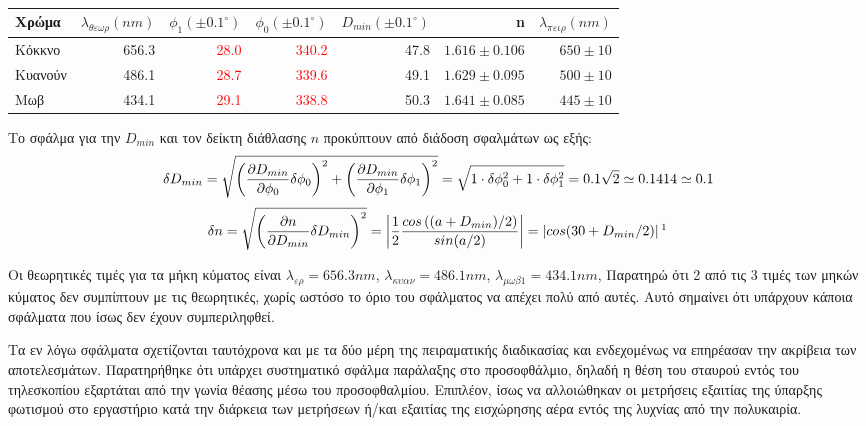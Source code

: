 \documentclass[a4paper]{article}
\begin{document}
\begin{table}[h!]
\centering 
\caption{ }
\begin{tabular}{l|r|r|r|r|r|r} 
  Χρώμα & $\lambda_{θεωρ}(nm)$&$\phi_1 (\pm0.1^{\circ})$ & $\phi_0 (\pm0.1^{\circ})$ &   $D_{min}(\pm0.1^{\circ})$
   & n & $\lambda_{πειρ}(nm)$ \\  
\hline \hline  
 Κόκκνο &   656.3 & \textcolor{red}{28.0} & \textcolor{red}{340.2} &   47.8   & $1.616\pm 0.106$   & $650\pm10$ \\     %
  Κυανούν &   486.1 & \textcolor{red}{28.7} & \textcolor{red}{339.6} &   49.1 & $1.629\pm 0.095$   & \underline{$500\pm10$} \\     %
  Μωβ &   434.1 & \textcolor{red}{29.1} & \textcolor{red}{338.8} &   50.3     & $1.641\pm 0.085$   & \underline{$445\pm10$} \\     %
 \end{tabular}
 \end{table}
 
 
 
 
Το σφάλμα για την $D_{min}$ και τον δείκτη διάθλασης $n$ προκύπτουν από διάδοση σφαλμάτων ως εξής: 
$$ \delta D_{min} = \sqrt{\left( \pdv{D_{min}}{\phi_0}\delta\phi_0\right)^2 + \left( \pdv{D_{min}}{\phi_1}\delta\phi_1 \right)^2 } = 
						\sqrt{1\cdot\delta\phi_0^2 + 1\cdot\delta\phi_1^2} = 0.1\sqrt{2} \simeq 0.1414 \simeq 0.1$$ 
$$ \delta n       = \sqrt{  \left( \pdv{n}{D_{min}} \delta D_{min} \right) ^2 } = 
					\left| \frac{1}{2}\frac{cos\left((a+D_{min})/2\right)}{sin(a/2)}\right|	= \left| cos(30+D_{min}/2) \right|\footnotemark $$  
					
Οι θεωρητικές τιμές για τα μήκη κύματος είναι $\lambda_{ερ}=656.3nm$, $\lambda_{κυαν}=486.1nm$, $\lambda_{μωβ1}=434.1nm$, %
Παρατηρώ ότι 2 από τις 3 τιμές των μηκών κύματος δεν συμπίπτουν με τις θεωρητικές, χωρίς ωστόσο το όριο του σφάλματος να απέχει πολύ από αυτές. 
Αυτό σημαίνει ότι υπάρχουν κάποια σφάλματα που ίσως δεν έχουν συμπεριληφθεί.


Τα εν λόγω σφάλματα σχετίζονται ταυτόχρονα και με τα δύο μέρη της πειραματικής διαδικασίας και ενδεχομένως να επηρέασαν την ακρίβεια των αποτελεσμάτων. Παρατηρήθηκε ότι υπάρχει συστηματικό σφάλμα παράλαξης στο προσοφθάλμιο, δηλαδή η θέση του σταυρού εντός του τηλεσκοπίου εξαρτάται από την γωνία θέασης μέσω του προσοφθαλμίου.
Επιπλέον, ίσως να αλλοιώθηκαν οι μετρήσεις
εξαιτίας της ύπαρξης φωτισμού στο εργαστήριο κατά την διάρκεια των μετρήσεων ή/και εξαιτίας της εισχώρησης αέρα εντός της λυχνίας από την πολυκαιρία.
\end{document}
